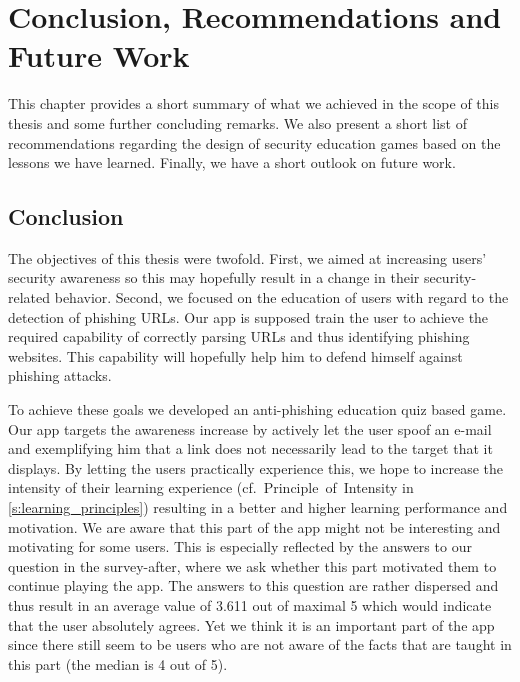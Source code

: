 
\section{Conclusion, Recommendations and Future Work}
\label{s:conclusion}

This chapter provides a short summary of what we achieved in the scope of this thesis and some further concluding remarks.
We also present a short list of recommendations regarding the design of security education games based on the lessons we have learned.
Finally, we have a short outlook on future work.
\subsection{Conclusion}
The objectives of this thesis were twofold.
First, we aimed at increasing users' security awareness so this may hopefully result in a change in their security-related behavior.
Second, we focused on the education of users with regard to the detection of phishing URLs. 
Our app is supposed train the user to achieve the required capability of correctly parsing URLs and thus identifying phishing websites.
This capability will hopefully help him to defend himself against phishing attacks.

To achieve these goals we developed an anti-phishing education quiz based game.
Our app targets the awareness increase by actively let the user spoof an e-mail and exemplifying him that a link does not necessarily lead to the target that it displays.
By letting the users practically experience this, we hope to increase the intensity of their learning experience (cf.~Principle~of~Intensity in \autoref{s:learning_principles}) resulting in a better and higher learning performance and motivation. We are aware that this part of the app might not be interesting and motivating for some users.
This is especially reflected by the answers to our question in the survey-after, where we ask whether this part motivated them to continue playing the app. 
The answers to this question are rather dispersed and thus result in an average value of 3.611 out of maximal 5 which would indicate that the user absolutely agrees.
Yet we think it is an important part of the app since there still seem to be users who are not aware of the facts that are taught in this part (the median is 4 out of 5).

